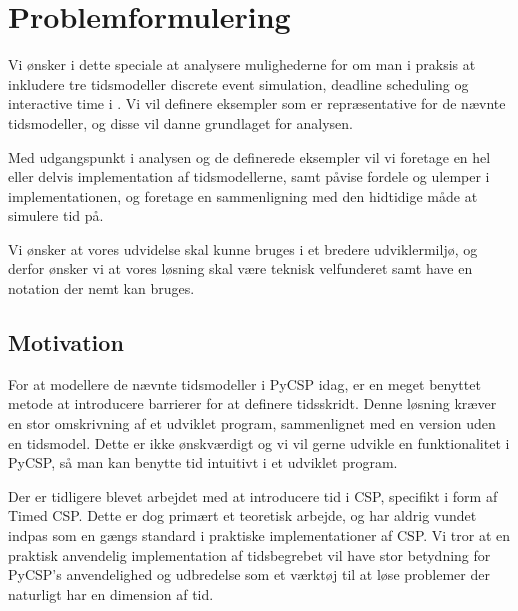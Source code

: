 \section*{Problemformulering}

Vi ønsker i dette speciale at analysere mulighederne for om man i praksis at inkludere tre tidsmodeller discrete event simulation, deadline scheduling og interactive time i \pycsp. Vi vil definere eksempler som er repræsentative for de nævnte tidsmodeller, og disse vil danne grundlaget for analysen.

Med udgangspunkt i analysen og de definerede eksempler vil vi foretage en hel eller delvis implementation af tidsmodellerne, samt påvise fordele og ulemper i implementationen, og foretage en sammenligning med den hidtidige måde at simulere tid på.

Vi ønsker at vores udvidelse skal kunne bruges i et bredere udviklermiljø, og derfor ønsker vi at vores løsning skal være teknisk velfunderet samt have en notation der nemt kan bruges.

\subsection*{Motivation}
For at modellere de nævnte tidsmodeller i PyCSP idag, er en meget benyttet metode at introducere barrierer for at definere tidsskridt. Denne løsning kræver en stor omskrivning af et udviklet program, sammenlignet med en version uden en tidsmodel. Dette er ikke ønskværdigt og vi vil gerne udvikle en funktionalitet i PyCSP, så man kan benytte tid intuitivt i et udviklet program.

Der er tidligere blevet arbejdet med at introducere tid i CSP, specifikt i form af Timed CSP. Dette er dog primært et teoretisk arbejde, og har aldrig vundet indpas som en gængs standard i praktiske implementationer af CSP. 
Vi tror at en praktisk anvendelig implementation af tidsbegrebet vil have stor betydning for PyCSP's anvendelighed og udbredelse som et værktøj til at løse problemer der naturligt har en dimension af tid. 


